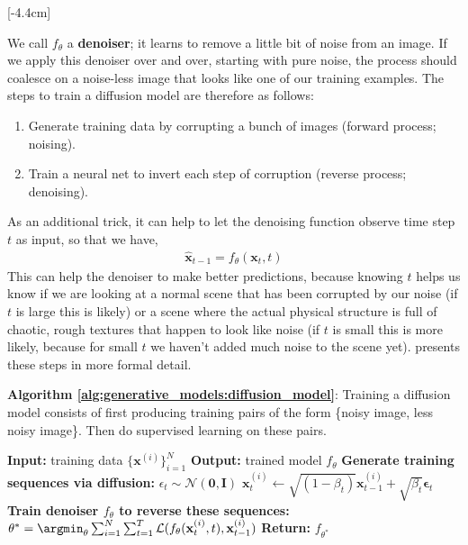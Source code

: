 [-4.4cm]

We call $f_{\theta}$ a \textbf{denoiser}; it learns to remove a little bit of noise from an image. If we apply this denoiser over and over, starting with pure noise, the process should coalesce on a noise-less image that looks like one of our training examples. The steps to train a diffusion model are therefore as follows:
\begin{enumerate}
    \item Generate training data by corrupting a bunch of images (forward process; noising).
    \item Train a neural net to invert each step of corruption (reverse process; denoising).
\end{enumerate}
As an additional trick, it can help to let the denoising function observe time step $t$ as input, so that we have,
\begin{align}
    \hat{\mathbf{x}}_{t-1} = f_{\theta}(\mathbf{x}_t, t)
\end{align}
This can help the denoiser to make better predictions, because knowing $t$ helps us know if we are looking at a normal scene that has been corrupted by our noise (if $t$ is large this is likely) or a scene where the actual physical structure is full of chaotic, rough textures that happen to look like noise (if $t$ is small this is more likely, because for small $t$ we haven't added much noise to the scene yet).
\Algref{\ref{alg:generative_models:diffusion_model}} presents these steps in more formal detail.
\begin{algorithm}[h]
\SetAlgoVlined
\DontPrintSemicolon
\caption{{\bf Algorithm \ref{alg:generative_models:diffusion_model}}: Training a diffusion model consists of first producing training pairs of the form \{noisy image, less noisy image\}. Then do supervised learning on these pairs.}
\fakealgorithmcaption{}
\label{alg:generative_models:diffusion_model}
{\bf Input:} training data $\{\mathbf{x}^{(i)}\}^N_{i=1}$\;
{\bf Output:} trained model $f_{\theta}$\;
{\bf Generate training sequences via diffusion:}\;
     {
         {
            $\epsilon_t \sim \mathcal{N}(\mathbf{0},\mathbf{I})$\;
            $\mathbf{x}^{(i)}_t \leftarrow \sqrt{(1-\beta_t)}\mathbf{x}^{(i)}_{t-1}  + \sqrt{\beta_t}\mathbf{\epsilon}_t$
        }
    }\;
{\bf Train denoiser $f_{\theta}$ to reverse these sequences:}\;
    $\theta^* = \argmin_{\theta} \sum^N_{i=1} \sum^T_{t=1} \mathcal{L}(f_{\theta}(\mathbf{x}_t^{(i)}, t), \mathbf{x}^{(i)}_{t-1})$\;
{\bf Return:} $f_{\theta^*}$\;
\end{algorithm}

